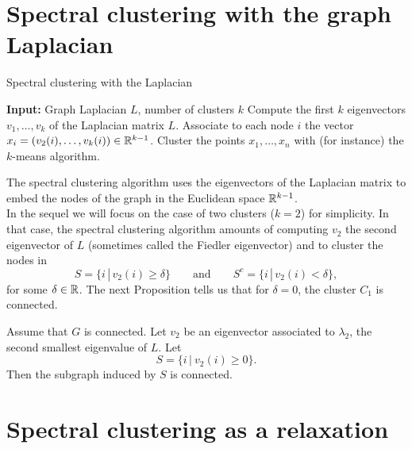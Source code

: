 \documentclass[11pt,nocut]{article}
\begin{document}
\section{Spectral clustering with the graph Laplacian}

\begin{algorithm}
\caption{Spectral clustering with the Laplacian}
\begin{algorithmic}[1]
	\Statex \textbf{Input:} Graph Laplacian $L$, number of clusters $k$
	\State Compute the first $k$ eigenvectors $v_1, \dots, v_k$ of the Laplacian matrix $L$.
	\State Associate to each node $i$ the vector $x_i = (v_2(i), \dots, v_k(i)) \in \mathbb{R}^{k-1}$.
	\State Cluster the points $x_1, \dots, x_n$ with (for instance) the $k$-means algorithm.
\end{algorithmic}
\end{algorithm}

The spectral clustering algorithm uses the eigenvectors of the Laplacian matrix to embed the nodes of the graph in the Euclidean space $\mathbb{R}^{k-1}$.
\\

In the sequel we will focus on the case of two clusters ($k=2$) for simplicity.
In that case, the spectral clustering algorithm amounts of computing $v_2$ the second eigenvector of $L$ (sometimes called the Fiedler eigenvector) and to cluster the nodes in
$$
S = \{ i \, | \, v_2(i) \geq \delta \} \qquad \text{and} \qquad
S^c = \{ i \, | \, v_2(i) < \delta \},
$$
for some $\delta \in \mathbb{R}$.
The next Proposition tells us that for $\delta = 0$, the cluster $C_1$ is connected.
\begin{proposition}
	Assume that $G$ is connected. Let $v_2$ be an eigenvector associated to $\lambda_2$, the second smallest eigenvalue of $L$. Let
	$$
	S = \{ i \, | \ v_2(i) \geq 0 \}.
	$$
	Then the subgraph induced by $S$ is connected.
\end{proposition}

\section{Spectral clustering as a relaxation}
\end{document}
